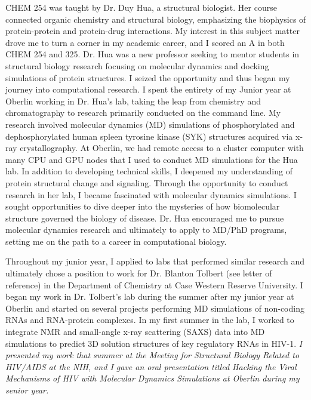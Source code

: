 \documentclass{NIHGrant}
\begin{document}
CHEM 254 was taught by Dr. Duy Hua, a structural biologist. Her course connected organic chemistry and structural biology, emphasizing the biophysics of protein-protein and protein-drug interactions. My interest in this subject matter drove me to turn a corner in my academic career, and I scored an A in both CHEM 254 and 325. Dr. Hua was a new professor seeking to mentor students in structural biology research focusing on molecular dynamics and docking simulations of protein structures. I seized the opportunity and thus began my journey into computational research. I spent the entirety of my Junior year at Oberlin working in Dr. Hua's lab, taking the leap from chemistry and chromatography to research primarily conducted on the command line. My research involved molecular dynamics (MD) simulations of phosphorylated and dephosphorylated human spleen tyrosine kinase (SYK) structures acquired via x-ray crystallography. At Oberlin, we had remote access to a cluster computer with many CPU and GPU nodes that I used to conduct MD simulations for the Hua lab. In addition to developing technical skills, I deepened my understanding of protein structural change and signaling. Through the opportunity to conduct research in her lab, I became fascinated with molecular dynamics simulations. I sought opportunities to dive deeper into the mysteries of how biomolecular structure governed the biology of disease. Dr. Hua encouraged me to pursue molecular dynamics research and ultimately to apply to MD/PhD programs, setting me on the path to a career in computational biology.

Throughout my junior year, I applied to labs that performed similar research and ultimately chose a position to work for Dr. Blanton Tolbert (see letter of reference) in the Department of Chemistry at Case Western Reserve University. I began my work in Dr. Tolbert's lab during the summer after my junior year at Oberlin and started on several projects performing MD simulations of non-coding RNAs and RNA-protein complexes. In my first summer in the lab, I worked to integrate NMR and small-angle x-ray scattering (SAXS) data into MD simulations to predict 3D solution structures of key regulatory RNAs in HIV-1. \emph{I presented my work that summer at the Meeting for Structural Biology Related to HIV/AIDS at the NIH, and I gave an oral presentation titled \textit{Hacking the Viral Mechanisms of HIV with Molecular Dynamics Simulations} at Oberlin during my senior year.}
\end{document}
